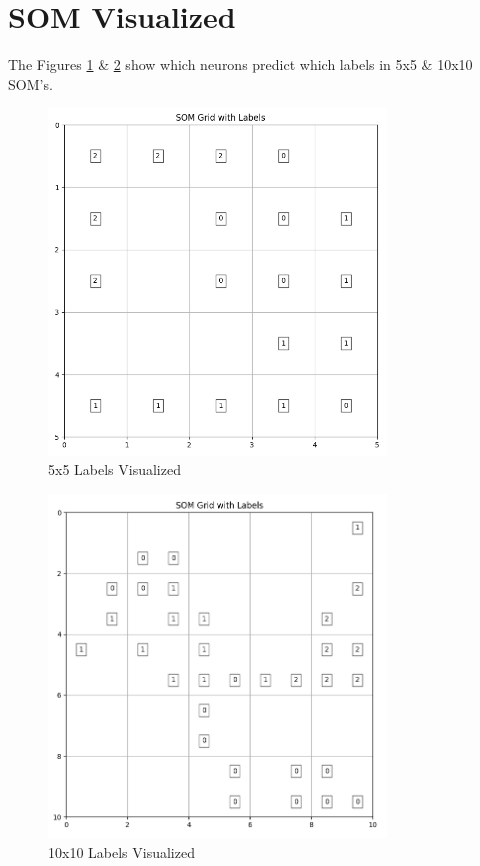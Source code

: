 \documentclass{article}
\begin{document}
\section*{SOM Visualized}
The Figures \ref{fig:5-labels} \& \ref{fig:10-labels} show which neurons predict which labels in 5x5 \& 10x10 SOM's.
\begin{figure}[H]
    \centering
    \includegraphics[width=0.8\textwidth]{5-labels.png}
    \caption{5x5 Labels Visualized}
    \label{fig:5-labels}
\end{figure}
\begin{figure}[H]
    \centering
    \includegraphics[width=0.8\textwidth]{10-labels.png}
    \caption{10x10 Labels Visualized}
    \label{fig:10-labels}
\end{figure}
\end{document}
